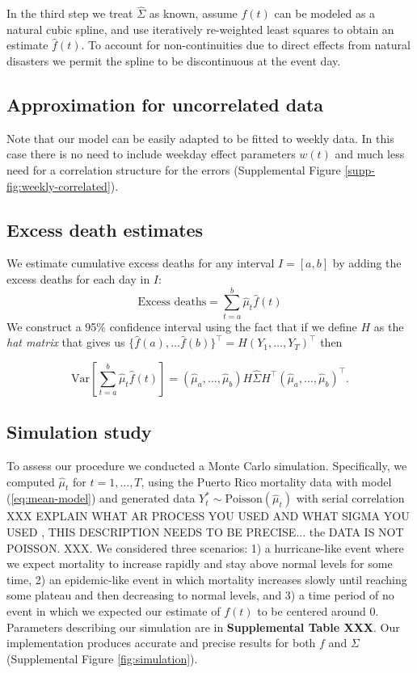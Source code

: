 \documentclass[11pt]{article}
\begin{document}
In the third step we treat $\hat{\Sigma}$ as known, assume $f(t)$ can be modeled as a natural cubic spline, and use iteratively re-weighted least squares to obtain an estimate $\hat{f}(t)$. To account for non-continuities due to direct effects from natural disasters we permit the spline to be discontinuous at the event day. 

\subsection{Approximation for uncorrelated data}
Note that our model can be easily adapted to be fitted to weekly data. In this case there is no need to include weekday effect parameters $w(t)$ and much less need for a correlation structure for the errors (Supplemental Figure \ref{supp-fig:weekly-correlated}). 

\subsection{Excess death estimates}
\label{subsec:excess-deaths}
We estimate cumulative excess deaths for any interval $I = [a, b]$ 
by adding the excess deaths for each day
in $I$: 
\begin{equation*}
    \mbox{Excess deaths} = \sum_{t = a}^b \hat{\mu}_t \hat{f}(t) 
\end{equation*}
We construct a 95\% confidence interval using the fact that if we define $H$ as the \emph{hat matrix} that gives us 
$\{ \hat{f}(a), \dots \hat{f}(b) \}^\top = H (Y_1, \dots, Y_T)^\top$ then

 \begin{equation*}
    \mbox{Var}\left[\sum_{t = a}^b \hat{\mu}_t \hat{f}(t) \right] = (\hat{\mu}_a,\dots,\hat{\mu}_b) H \hat{\Sigma} H^\top (\hat{\mu}_a,\dots,\hat{\mu}_b)^\top.
 \end{equation*}
 
\subsection{Simulation study}
To assess our procedure we conducted a Monte Carlo simulation. Specifically, we computed $\hat{\mu}_t$ for $t=1,\ldots, T$, using the Puerto Rico mortality data with model (\ref{eq:mean-model}) and generated data $Y_t^* \sim \mbox{Poisson}(\hat{\mu}_t)$ with serial correlation XXX EXPLAIN WHAT AR PROCESS YOU USED AND WHAT SIGMA YOU USED , THIS DESCRIPTION NEEDS TO BE PRECISE... the DATA IS NOT POISSON. XXX. We considered three scenarios: 1) a hurricane-like event where we expect mortality to increase rapidly and stay above normal levels for some time, 2) an epidemic-like event in which mortality increases slowly until reaching some plateau and then decreasing to normal levels, and 3) a time period of no event in which we expected our estimate of $f(t)$ to be centered around 0. Parameters describing our simulation are in \textbf{Supplemental Table XXX}. Our implementation produces accurate and precise results for both $f$ and $\Sigma$ (Supplemental Figure \ref{fig:simulation}).
\end{document}
